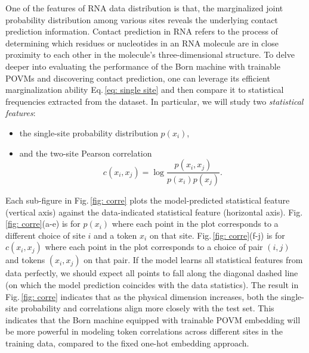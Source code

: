 \documentclass[aps,prb,twocolumn,superscriptaddress]{revtex4-2}
\newcommand{\eqnref}[1]{Eq.\,\eqref{#1}}
\newcommand{\figref}[1]{Fig.\,\ref{#1}}
\begin{document}
One of the features of RNA data distribution is that, the marginalized joint probability distribution among various sites reveals the underlying contact prediction information\cite{trinquier2021efficient}. Contact prediction in RNA refers to the process of determining which residues or nucleotides in an RNA molecule are in close proximity to each other in the molecule's three-dimensional structure. To delve deeper into evaluating the performance of the Born machine with trainable POVMs and discovering contact prediction, one can leverage its efficient marginalization ability \eqnref{eq: single site} and then compare it to statistical frequencies extracted from the dataset. In particular, we will study two \textit{statistical features}:
\begin{itemize}
\item the single-site probability distribution $p(x_i)$,
\item and the two-site Pearson correlation
\begin{equation}\label{eq: corre}
    c(x_i,x_j)=\log\frac{p(x_i,x_j)}{p(x_i)p(x_j)}.
\end{equation}
\end{itemize}
Each sub-figure in \figref{fig: corre} plots the model-predicted statistical feature (vertical axis) against the data-indicated statistical feature (horizontal axis). \figref{fig: corre}(a-e) is for $p(x_i)$ where each point in the plot corresponds to a different choice of site $i$ and a token $x_i$ on that site. \figref{fig: corre}(f-j) is for $c(x_i,x_j)$ where each point in the plot corresponds to a choice of pair $(i,j)$ and tokens $(x_i,x_j)$ on that pair. If the model learns all statistical features from data perfectly, we should expect all points to fall along the diagonal dashed line (on which the model prediction coincides with the data statistics).  The result in \figref{fig: corre} indicates that as the physical dimension increases, both the single-site probability and correlations align more closely with the test set. This indicates that the Born machine equipped with trainable POVM embedding will be more powerful in modeling token correlations across different sites in the training data, compared to the fixed one-hot embedding approach.
\end{document}
